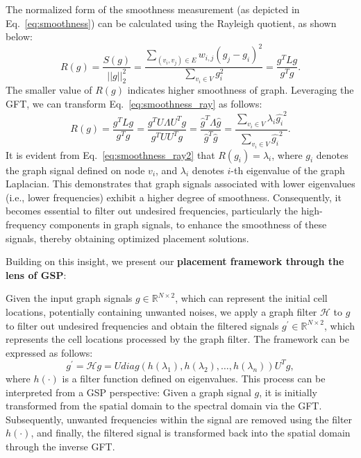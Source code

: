 The normalized form of the smoothness measurement (as depicted in Eq.~\ref{eq:smoothness}) can be calculated using the Rayleigh quotient, as shown below:
\begin{equation}\label{eq:smoothness_ray}
R(g)=\frac{S(g)}{||g||_2^2}=\frac{\sum_{(v_i,v_j)\in E}w_{i,j}(g_j-g_i)^2}{\sum_{v_i \in V}g_i^2}=\frac{g^TLg}{g^Tg}.
\end{equation}
The smaller value of $R(g)$ indicates higher smoothness of graph. 
Leveraging the GFT, we can transform Eq.~\ref{eq:smoothness_ray} as follows:
\begin{equation}\label{eq:smoothness_ray2}
R(g)=\frac{g^TLg}{g^Tg}=\frac{g^TU\Lambda U^Tg}{g^TUU^Tg}=\frac{\hat{g}^T\Lambda\hat{g}}{\hat{g}^T\hat{g}}=\frac{\sum_{v_i \in V} \lambda_i\hat{g_i}^2}{\sum_{v_i \in V}\hat{g_i}^2}.
\end{equation}
It is evident from Eq.~\ref{eq:smoothness_ray2} that $R(g_i)=\lambda_i$, where $g_i$ denotes the graph signal defined on node $v_i$, and $\lambda_i$ denotes $i$-th eigenvalue of the graph Laplacian. This demonstrates that graph signals associated with lower eigenvalues (i.e., lower frequencies) exhibit a higher degree of smoothness.
Consequently, it becomes essential to filter out undesired frequencies, particularly the high-frequency components in graph signals, to enhance the smoothness of these signals, thereby obtaining optimized placement solutions.

Building on this insight, we present our \textbf{placement framework through the lens of GSP}:

Given the input graph signals $g \in \mathbb{R}^{N \times 2}$, which can represent the initial cell locations, potentially containing unwanted noises, we apply a graph filter $\mathcal{H}$ to $g$ to filter out undesired frequencies and obtain the filtered signals $g^{\prime} \in \mathbb{R}^{N \times 2}$, which represents the cell locations processed by the graph filter. The framework can be expressed as follows:
\begin{equation}\label{eq:unified_framework}
g^{\prime}=\mathcal{H}g=Udiag(h(\lambda_1),h(\lambda_2), \ldots, h(\lambda_n))U^Tg,
\end{equation}
where $h(\cdot)$ is a filter function defined on eigenvalues.
This process can be interpreted from a GSP perspective: Given a graph signal $g$, it is initially transformed from the spatial domain to the spectral domain via the GFT.  
Subsequently, unwanted frequencies within the signal are removed using the filter $h(\cdot)$, and finally, the filtered signal is transformed back into the spatial domain through the inverse GFT.


